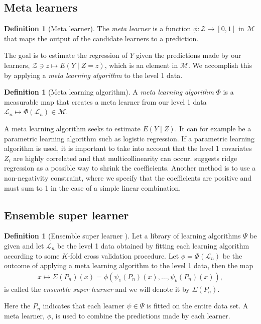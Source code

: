 \documentclass[11pt, a4paper]{article}
\theoremstyle{definition}
\newtheorem{definition}[theorem]{Definition}
\theoremstyle{remark}
\newcommand{\la}{\psi}
\newcommand{\lib}{\Psi}
\newcommand{\lone}{\mathcal{L}}
\newcommand{\meta}{\phi}
\newcommand{\Meta}{\Phi}
\newcommand{\esl}{\Sigma}
\begin{document}
\subsection{Meta learners}
\begin{definition}[Meta learner]
    The \textit{meta learner} is a function $ \meta: \mathcal{Z} \to [0,1] $ in $ \mathcal{M} $ that maps the output of the candidate learners to a prediction. 
\end{definition}
The goal is to estimate the regression of $ Y $ given the predictions made by our learners, $ \mathcal{Z} \ni z \mapsto E(Y \mid Z = z) $, which is an element in $ \mathcal{M} $. We accomplish this by applying a \textit{meta learning algorithm} to the level 1 data. 
\begin{definition}[Meta learning algorithm]
    A \textit{meta learning algorithm} $ \Meta $ is a measurable map that creates a meta learner from our level 1 data $ \lone_{n} \mapsto \Meta(\lone_{n}) \in \mathcal{M} $. 
\end{definition}
A meta learning algorithm seeks to estimate $ E (Y \mid Z) $. It can for example be a parametric learning algorithm such as logistic regression. If a parametric learning algorithm is used, it is important to take into account that the level 1 covariates $ Z_i $ are highly correlated and that multicollinearity can occur. \citet{breiman1996stacked} suggests ridge regression as a possible way to shrink the coefficients. Another method is to use a non-negativity constraint, where we specify that the coefficients are positive and must sum to 1 in the case of a simple linear combination. 

\subsection{Ensemble super learner}
\begin{definition}[Ensemble super learner \parencite{van2007super}]
    Let a library of learning algorithms $ \lib $ be given and let $ \lone_{n} $ be the level 1 data obtained by fitting each learning algorithm according to some $ K $-fold cross validation procedure. Let $ \meta = \Meta(\lone_{n}) $ be the outcome of applying a meta learning algorithm to the level 1 data, then the map 
    \begin{align*}
       x \mapsto \esl(P_n)(x) = \meta(\la_1(P_{n})(x), \ldots, \la_k(P_{n})(x) ),
    \end{align*}
    is called the \textit{ensemble super learner} and we will denote it by $ \esl(P_{n}) $. 
\end{definition}
Here the $ P_n $ indicates that each learner $ \la \in \lib $ is fitted on the entire data set. A meta learner, $ \meta $, is used to combine the predictions made by each learner. 
\end{document}
